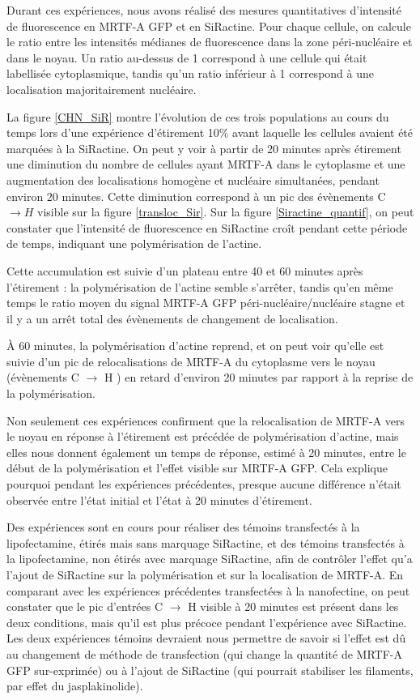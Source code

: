 Durant ces expériences, nous avons réalisé des mesures quantitatives d'intensité de fluorescence en MRTF-A GFP et en SiRactine. Pour chaque cellule, on calcule le ratio entre les intensités médianes de fluorescence dans la zone péri-nucléaire et dans le noyau. Un ratio au-dessus de 1 correspond à une cellule qui était labellisée cytoplasmique, tandis qu'un ratio inférieur à 1 correspond à une localisation majoritairement nucléaire. 






La figure \ref{CHN_SiR} montre l'évolution de ces trois populations au cours du temps lors d'une expérience d'étirement 10\% avant laquelle les cellules avaient été marquées à la SiRactine. 
On peut y voir à partir de 20 minutes après étirement une diminution du nombre de cellules ayant MRTF-A dans le cytoplasme et une augmentation des localisations homogène et nucléaire simultanées, pendant environ 20 minutes. 
Cette diminution correspond à un pic des évènements C $\rightarrow H$ visible sur la figure \ref{transloc_Sir}. 
Sur la figure \ref{Siractine_quantif}, on peut constater que l'intensité de fluorescence en SiRactine croît pendant cette période de temps, indiquant une polymérisation de l'actine. 

Cette accumulation est suivie d'un plateau entre 40 et 60 minutes après l'étirement : la polymérisation de l'actine semble s'arrêter, tandis qu'en même temps le ratio moyen du signal MRTF-A GFP péri-nucléaire/nucléaire stagne et il y a un arrêt total des évènements de changement de localisation. 

À 60 minutes, la polymérisation d'actine reprend, et on peut voir qu'elle est suivie d'un pic de relocalisations de MRTF-A du cytoplasme vers le noyau (évènements C $\rightarrow$ H ) en retard d'environ 20 minutes par rapport à la reprise de la polymérisation. 

Non seulement ces expériences confirment que la relocalisation de MRTF-A vers le noyau en réponse à l'étirement est précédée de polymérisation d'actine, mais elles nous donnent également un temps de réponse, estimé à 20 minutes, entre le début de la polymérisation et l'effet visible sur MRTF-A GFP. Cela explique pourquoi pendant les expériences précédentes, presque aucune différence n'était observée entre l'état initial et l'état à 20 minutes d'étirement.

Des expériences sont en cours pour réaliser des témoins transfectés à la lipofectamine, étirés mais sans marquage SiRactine, et des témoins transfectés à la lipofectamine, non étirés avec marquage SiRactine, afin de contrôler l'effet qu'a l'ajout de SiRactine sur la polymérisation et sur la localisation de MRTF-A. 
En comparant avec les expériences précédentes transfectées à la nanofectine, on peut constater que le pic d'entrées C $\rightarrow$ H visible à 20 minutes est présent dans les deux conditions, mais qu'il est plus précoce pendant l'expérience avec SiRactine. Les deux expériences témoins devraient nous permettre de savoir si l'effet est dû au changement de méthode de transfection (qui change la quantité de MRTF-A GFP sur-exprimée) ou à l'ajout de SiRactine (qui pourrait stabiliser les filaments, par effet du jasplakinolide). 
 

